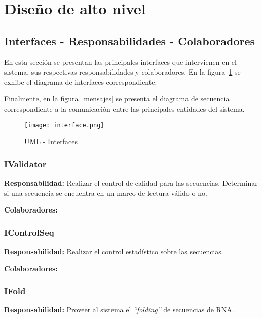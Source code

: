 \section{Diseño de alto nivel}
\label{high_level_design}

\subsection{Interfaces - Responsabilidades - Colaboradores}
En esta sección se presentan las principales interfaces que intervienen en el sistema, sus respectivas responsabilidades y colaboradores. En la figura~\ref{interface} se exhibe el diagrama de interfaces correspondiente.

Finalmente, en la figura~\ref{mensajes} se presenta el diagrama de secuencia correspondiente a la comunicación entre las principales entidades del sistema.

\begin{figure}[!hbtp]
	\begin{center}
		\texttt{[image: interface.png]}
		\caption{UML - Interfaces}
		\label{interface}
	\end{center}
\end{figure}

\subsubsection{IValidator}
\par \textbf{Responsabilidad:} Realizar el control de calidad para las secuencias. Determinar si una secuencia se encuentra en un marco de lectura válido o no. 

\par \textbf{Colaboradores:}
 
\subsubsection{IControlSeq}
\par \textbf{Responsabilidad:} Realizar el control estadístico sobre las secuencias.

\par \textbf{Colaboradores:}

\subsubsection{IFold}
\par \textbf{Responsabilidad:} Proveer al sistema el \emph{``folding''} de secuencias de RNA.


